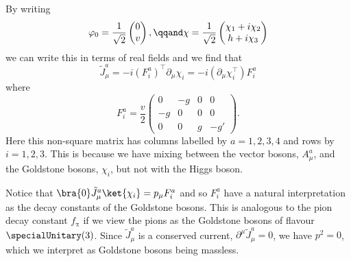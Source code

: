 \documentclass[fleqn]{NotesClass}
\newcommand{\Ppi}{\ensuremath{\uppi}}
\newcommand{\trans}{\top}
\begin{document}
    By writing
    \begin{equation}
        \varphi_0 = \frac{1}{\sqrt{2}}
        \begin{pmatrix}
            0\\ v
        \end{pmatrix}
        , \qqand \chi = \frac{1}{\sqrt{2}}
        \begin{pmatrix}
            \chi_1 + i\chi_2\\
            h + i\chi_3
        \end{pmatrix}
    \end{equation}
    we can write this in terms of real fields and we find that
    \begin{equation}
        \tilde{J}^a_\mu = -i(F^a_i)^{\trans}\partial_\mu \chi_i = -i(\partial_\mu\chi_i^\trans) F^a_i
    \end{equation}
    where
    \begin{equation}
        F^a_i = \frac{v}{2}
        \begin{pmatrix}
            0 & -g & 0 & 0\\
            -g & 0 & 0 & 0\\
            0 & 0 & g & -g'
        \end{pmatrix}
        .
    \end{equation}
    Here this non-square matrix has columns labelled by \(a = 1, 2, 3, 4\) and rows by \(i = 1, 2, 3\).
    This is because we have mixing between the vector bosons, \(A^a_\mu\), and the Goldstone bosons, \(\chi_i\), but not with the Higgs boson.
    
    Notice that \(\bra{0} \tilde{J}^a_\mu \ket{\chi_i} = p_\mu F^a_i\) and so \(F^a_i\) have a natural interpretation as the decay constants of the Goldstone bosons.
    This is analogous to the pion decay constant \(f_{\Ppi}\) if we view the pions as the Goldstone bosons of flavour \(\specialUnitary(3)\).
    Since \(\tilde{J}^a_\mu\) is a conserved current, \(\partial^\mu \tilde{J}^a_\mu = 0\), we have \(p^2 = 0\), which we interpret as Goldstone bosons being massless.
    
\end{document}
